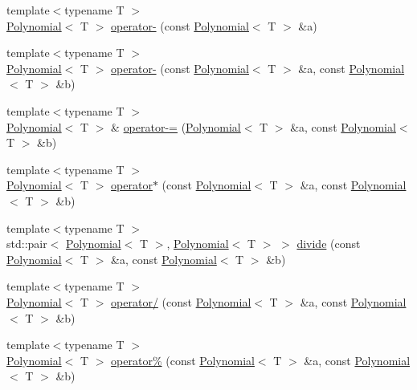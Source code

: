 \begin{DoxyCompactItemize}
\item 
{\footnotesize template$<$typename T $>$ }\\\hyperlink{classMackey_1_1Polynomial}{Polynomial}$<$ T $>$ \hyperlink{namespaceMackey_a76e1e4a6dac913bc86971d8515475fa5}{operator-\/} (const \hyperlink{classMackey_1_1Polynomial}{Polynomial}$<$ T $>$ \&a)
\item 
{\footnotesize template$<$typename T $>$ }\\\hyperlink{classMackey_1_1Polynomial}{Polynomial}$<$ T $>$ \hyperlink{namespaceMackey_a803f57e25754b9ca58e4757a46f9b23a}{operator-\/} (const \hyperlink{classMackey_1_1Polynomial}{Polynomial}$<$ T $>$ \&a, const \hyperlink{classMackey_1_1Polynomial}{Polynomial}$<$ T $>$ \&b)
\item 
{\footnotesize template$<$typename T $>$ }\\\hyperlink{classMackey_1_1Polynomial}{Polynomial}$<$ T $>$ \& \hyperlink{namespaceMackey_a9cb1fbb70826d41d001bef40d09d9e3f}{operator-\/=} (\hyperlink{classMackey_1_1Polynomial}{Polynomial}$<$ T $>$ \&a, const \hyperlink{classMackey_1_1Polynomial}{Polynomial}$<$ T $>$ \&b)
\item 
{\footnotesize template$<$typename T $>$ }\\\hyperlink{classMackey_1_1Polynomial}{Polynomial}$<$ T $>$ \hyperlink{namespaceMackey_a7bbd83e8170a608aea65f7d916b4bc6d}{operator$\ast$} (const \hyperlink{classMackey_1_1Polynomial}{Polynomial}$<$ T $>$ \&a, const \hyperlink{classMackey_1_1Polynomial}{Polynomial}$<$ T $>$ \&b)
\item 
{\footnotesize template$<$typename T $>$ }\\std\+::pair$<$ \hyperlink{classMackey_1_1Polynomial}{Polynomial}$<$ T $>$, \hyperlink{classMackey_1_1Polynomial}{Polynomial}$<$ T $>$ $>$ \hyperlink{namespaceMackey_a04fadcf186ab504cafeb259178ee4827}{divide} (const \hyperlink{classMackey_1_1Polynomial}{Polynomial}$<$ T $>$ \&a, const \hyperlink{classMackey_1_1Polynomial}{Polynomial}$<$ T $>$ \&b)
\item 
{\footnotesize template$<$typename T $>$ }\\\hyperlink{classMackey_1_1Polynomial}{Polynomial}$<$ T $>$ \hyperlink{namespaceMackey_ac26fb6e8a8b7350d13f866570d588e6c}{operator/} (const \hyperlink{classMackey_1_1Polynomial}{Polynomial}$<$ T $>$ \&a, const \hyperlink{classMackey_1_1Polynomial}{Polynomial}$<$ T $>$ \&b)
\item 
{\footnotesize template$<$typename T $>$ }\\\hyperlink{classMackey_1_1Polynomial}{Polynomial}$<$ T $>$ \hyperlink{namespaceMackey_adb145e729d40138080b5a58d26a89388}{operator\%} (const \hyperlink{classMackey_1_1Polynomial}{Polynomial}$<$ T $>$ \&a, const \hyperlink{classMackey_1_1Polynomial}{Polynomial}$<$ T $>$ \&b)

\end{DoxyCompactItemize}
